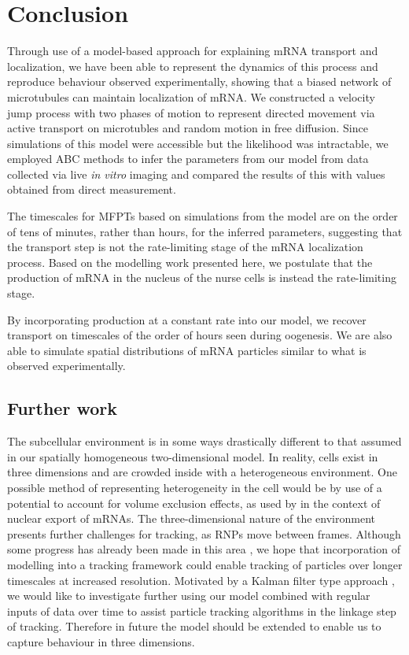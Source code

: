 \documentclass[twocolumn]{biophys}
\begin{document}
\section{Conclusion} \label{Conclusions}
Through use of a model-based approach for explaining mRNA transport and localization, we have been able to represent the dynamics of this process and reproduce behaviour observed experimentally, showing that a biased network of microtubules can maintain localization of mRNA.
We constructed a velocity jump process with two phases of motion to represent directed movement via active transport on microtubles and random motion in free diffusion.
Since simulations of this model were accessible but the likelihood was intractable, we employed ABC methods to infer the parameters from our model from data collected via live \textit{in vitro} imaging and compared the results of this with values obtained from direct measurement.

The timescales for MFPTs based on simulations from the model are on the order of tens of minutes, rather than hours, for the inferred parameters, suggesting that the transport step is not the rate-limiting stage of the mRNA localization process.
Based on the modelling work presented here, we postulate that the production of mRNA in the nucleus of the nurse cells is instead the rate-limiting stage.

By incorporating production at a constant rate into our model, we recover transport on timescales of the order of hours seen during oogenesis.
We are also able to simulate spatial distributions of mRNA particles similar to what is observed experimentally.  

\subsection{Further work}
The subcellular environment is in some ways drastically different to that assumed in our spatially homogeneous two-dimensional model.
In reality, cells exist in three dimensions and are crowded inside with a heterogeneous environment. 
One possible method of representing heterogeneity in the cell would be by use of a potential to account for volume exclusion effects, as used by \citet{isaacson2011influence} in the context of nuclear export of mRNAs.
The three-dimensional nature of the environment presents further challenges for tracking, as RNPs move between frames.
Although some progress has already been made in this area \citep{thompson2010three}, we hope that incorporation of modelling into a tracking framework could enable tracking of particles over longer timescales at increased resolution. 
Motivated by a Kalman filter type approach \citep{faragher2012understanding}, we would like to investigate further using our model combined with regular inputs of data over time to assist particle tracking algorithms in the linkage step of tracking.
Therefore in future the model should be extended to enable us to capture behaviour in three dimensions. 
\end{document}
